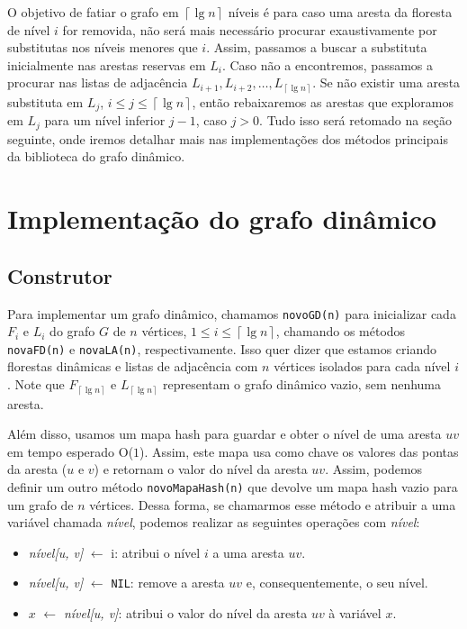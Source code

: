 O objetivo de fatiar o grafo em  $\left\lceil \lg n \right\rceil$ níveis é para caso uma aresta da floresta de nível $i$ for removida, não será mais necessário procurar exaustivamente por substitutas nos níveis menores que $i$. Assim, passamos a buscar a substituta inicialmente nas arestas reservas em $L_i$. Caso não a encontremos, passamos a procurar nas listas de adjacência $L_{i+1}, L_{i+2}, \ldots, L_{ \left\lceil \lg n \right\rceil}$. Se não existir uma aresta substituta em $L_j$, $i \leq j \leq  \left\lceil \lg n \right\rceil$, então rebaixaremos as arestas que exploramos em $L_j$ para um nível inferior $j-1$, caso $j > 0$. Tudo isso será retomado na seção seguinte, onde iremos detalhar mais nas implementações dos métodos principais da biblioteca do grafo dinâmico. 

\section{Implementação do grafo dinâmico}
\label{sec:dynamic-graph-implementation}

\subsection{Construtor}
\label{sec:code-constructor}

Para implementar um grafo dinâmico, chamamos \texttt{novoGD(n)} para inicializar cada $F_i$ e $L_i$ do grafo $G$ de $n$ vértices, $1 \leq i \leq \left\lceil \lg n \right\rceil$, chamando os métodos \texttt{novaFD(n)} e \texttt{novaLA(n)}, respectivamente. Isso quer dizer que estamos criando florestas dinâmicas e listas de adjacência com $n$ vértices isolados para cada nível $i$. Note que $F_{\left\lceil \lg n \right\rceil}$ e $L_{\left\lceil \lg n \right\rceil}$ representam o grafo dinâmico vazio, sem nenhuma aresta. 

Além disso, usamos um mapa hash para guardar e obter o nível de uma aresta $uv$ em tempo esperado O($1$). Assim, este mapa usa como chave os valores das pontas da aresta ($u$ e $v$) e retornam o valor do nível da aresta $uv$. Assim, podemos definir um outro método \texttt{novoMapaHash(n)} que devolve um mapa hash vazio para um grafo de $n$ vértices. Dessa forma, se chamarmos esse método e atribuir a uma variável chamada \textit{nível}, podemos realizar as seguintes operações com \textit{nível}:

\begin{itemize}
    \item \textit{nível[u, v]} $\leftarrow$ i: atribui o nível $i$ a uma aresta $uv$. 
    
    \item \textit{nível[u, v]} $\leftarrow$ \texttt{NIL}: remove a aresta $uv$ e, consequentemente, o seu nível.
    
    \item $x$ $\leftarrow$ \textit{nível[u, v]}: atribui o valor do nível da aresta $uv$ à variável $x$. 
\end{itemize}


